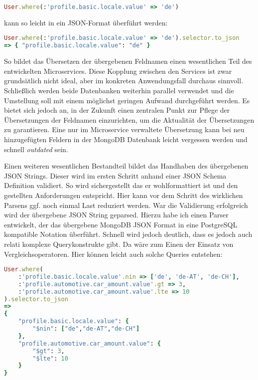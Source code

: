 \begin{lstlisting}[language=Ruby]
User.where(:'profile.basic.locale.value' => 'de')
\end{lstlisting}

\noindent kann so leicht in ein JSON-Format überführt werden:

\begin{lstlisting}[language=Ruby]
User.where(:'profile.basic.locale.value' => 'de').selector.to_json
=> { "profile.basic.locale.value": "de" }
\end{lstlisting}

\noindent So bildet das Übersetzen der übergebenen Feldnamen einen wesentlichen Teil des entwickelten Microservices.
Diese Kopplung zwischen den Services ist zwar grundsätlich nicht ideal, aber im konkreten Anwendungsfall durchaus sinnvoll. Schließlich werden beide Datenbanken weiterhin parallel verwendet und die Umstellung soll mit einem möglichst geringen Aufwand durchgeführt werden.
Es bietet sich jedoch an, in der Zukunft einen zentralen Punkt zur Pflege der Übersetzungen der Feldnamen einzurichten, um die Aktualität der Übersetzungen zu garantieren. Eine nur im Microservice verwaltete Übersetzung kann bei neu hinzugefügten Feldern in der MongoDB Datenbank leicht vergessen werden und schnell \textit{outdated} sein.

Einen weiteren wesentlichen Bestandteil bildet das Handhaben des übergebenen JSON Strings. Dieser wird im ersten Schritt anhand einer JSON Schema\cite{jsonschema} Definition validiert. So wird sichergestellt das er wohlformattiert ist und den gestellten Anforderungen entspricht. Hier kann vor dem Schritt des wirklichen Parsens ggf. noch einmal Last reduziert werden. War die Validierung erfolgreich wird der übergebene JSON String geparsed. Hierzu habe ich einen Parser entwickelt, der das übergebene MongoDB JSON Format in eine PostgreSQL kompatible Notation überführt. Schnell wird jedoch deutlich, dass es jedoch auch relati komplexe Querykonstrukte gibt. Da wäre zum Einen der Einsatz von Vergleichsoperatoren. Hier können leicht auch solche Queries entstehen:

\begin{lstlisting}[language=Ruby]
User.where(
    :'profile.basic.locale.value'.nin => ['de', 'de-AT', 'de-CH'],
    :'profile.automotive.car_amount.value'.gt => 3,
    :'profile.automotive.car_amount.value'.lte => 10
).selector.to_json
=> 
{
    "profile.basic.locale.value": {
        "$nin": ["de","de-AT","de-CH"]
    },
    "profile.automotive.car_amount.value": {
        "$gt": 3,
        "$lte": 10
    }
}
\end{lstlisting}

